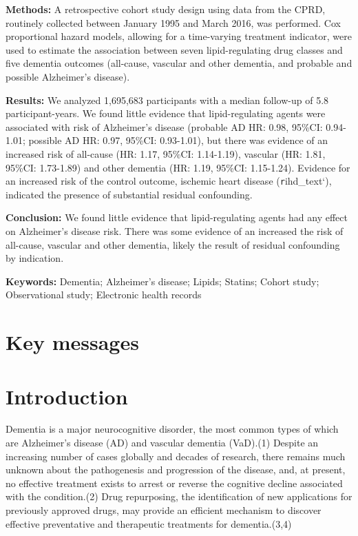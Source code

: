 \documentclass[
]{article}
\begin{document}
\textbf{Methods:} A retrospective cohort study design using data from the CPRD, routinely collected between January 1995 and March 2016, was performed. Cox proportional hazard models, allowing for a time-varying treatment indicator, were used to estimate the association between seven lipid-regulating drug classes and five dementia outcomes (all-cause, vascular and other dementia, and probable and possible Alzheimer's disease).

\textbf{Results:} We analyzed 1,695,683 participants with a median follow-up of 5.8 participant-years. We found little evidence that lipid-regulating agents were associated with risk of Alzheimer's disease (probable AD HR: 0.98, 95\%CI: 0.94-1.01; possible AD HR: 0.97, 95\%CI: 0.93-1.01), but there was evidence of an increased risk of all-cause (HR: 1.17, 95\%CI: 1.14-1.19), vascular (HR: 1.81, 95\%CI: 1.73-1.89) and other dementia (HR: 1.19, 95\%CI: 1.15-1.24). Evidence for an increased risk of the control outcome, ischemic heart disease (\texttt{r}ihd\_text`), indicated the presence of substantial residual confounding.

\textbf{Conclusion:} We found little evidence that lipid-regulating agents had any effect on Alzheimer's disease risk. There was some evidence of an increased the risk of all-cause, vascular and other dementia, likely the result of residual confounding by indication.

\textbf{Keywords:} Dementia; Alzheimer's disease; Lipids; Statins; Cohort study; Observational study; Electronic health records

\newpage

\hypertarget{key-messages}{%
\section{Key messages}\label{key-messages}}

\newpage

\hypertarget{introduction}{%
\section{Introduction}\label{introduction}}

Dementia is a major neurocognitive disorder, the most common types of which are Alzheimer's disease (AD) and vascular dementia (VaD).(1) Despite an increasing number of cases globally and decades of research, there remains much unknown about the pathogenesis and progression of the disease, and, at present, no effective treatment exists to arrest or reverse the cognitive decline associated with the condition.(2) Drug repurposing, the identification of new applications for previously approved drugs, may provide an efficient mechanism to discover effective preventative and therapeutic treatments for dementia.(3,4)
\end{document}
